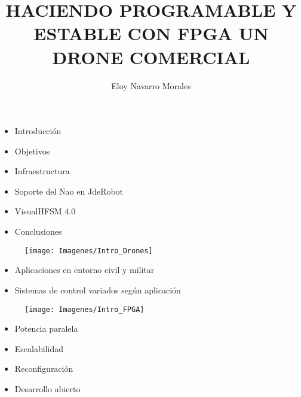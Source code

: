 \documentclass[a4,landscpae]{seminar}
\title{HACIENDO PROGRAMABLE Y ESTABLE CON FPGA UN DRONE COMERCIAL}
\author{Eloy Navarro Morales}
\begin{document}
\maketitle


\begin{hslide}
\begin{itemize}
	\item Introducci\'on
	\item Objetivos
	\item Infraestructura
	\item Soporte del Nao en JdeRobot
	\item VisualHFSM 4.0
	\item Conclusiones
\end{itemize}
\end{hslide}


\begin{hslide}
\begin{minipage}{6.1cm}
	\begin{figure}
		\texttt{[image: Imagenes/Intro\_Drones]}
	\end{figure}
\end{minipage} \hfill
\begin{minipage}{4.9cm}
	\begin{itemize}
		\item Aplicaciones en entorno civil y militar
		\item Sistemas de control variados seg\'un aplicaci\'on
	\end{itemize}
\end{minipage}

\end{hslide}


\begin{hslide}
\begin{minipage}{7cm}
	\begin{center}
		\begin{figure}
			\texttt{[image: Imagenes/Intro\_FPGA]}
		\end{figure}
	\end{center}
\end{minipage} \hfill
\begin{minipage}{3.5cm}
	\begin{itemize}
		\item Potencia paralela
		\item Escalabilidad
		\item Reconfiguraci\'on
		\item Desarrollo abierto
	\end{itemize}
\end{minipage}
\end{hslide}
\end{document}
